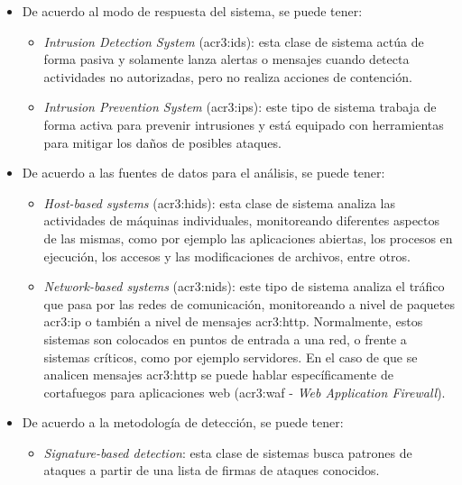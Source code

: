 \begin{itemize}
    \item
    De acuerdo al modo de respuesta del sistema, se puede tener:

    \begin{itemize}
        \item
        \textit{Intrusion Detection System} (\gls{acr3:ids}):
        esta clase de sistema actúa de forma pasiva y solamente lanza
        alertas o mensajes cuando detecta actividades no autorizadas,
        pero no realiza acciones de contención.

        \item
        \textit{Intrusion Prevention System} (\gls{acr3:ips}):
        este tipo de sistema trabaja de forma activa para prevenir
        intrusiones y está equipado con herramientas para mitigar los
        daños de posibles ataques.
    \end{itemize}

    \item
    De acuerdo a las fuentes de datos para el análisis, se puede tener:

    \begin{itemize}
        \item
        \textit{Host-based systems} (\gls{acr3:hids}):
        esta clase de sistema analiza las actividades de máquinas
        individuales, monitoreando diferentes aspectos de las mismas,
        como por ejemplo las aplicaciones abiertas, los procesos en
        ejecución, los accesos y las modificaciones de archivos, entre
        otros.

        \item
        \textit{Network-based systems} (\gls{acr3:nids}):
        este tipo de sistema analiza el tráfico que pasa por las redes
        de comunicación, monitoreando a nivel de paquetes \gls{acr3:ip}
        o también a nivel de mensajes \gls{acr3:http}.
        Normalmente, estos sistemas son colocados en puntos de entrada a
        una red, o frente a sistemas críticos, como por ejemplo servidores.
        En el caso de que se analicen mensajes \gls{acr3:http} se puede
        hablar específicamente de cortafuegos para aplicaciones web
        (\gls{acr3:waf} - \textit{Web Application Firewall}).
    \end{itemize}

    \item
    De acuerdo a la metodología de detección, se puede tener:

    \begin{itemize}
        \item
        \textit{Signature-based detection}:
        esta clase de sistemas busca patrones de ataques a partir de
        una lista de firmas de ataques conocidos.


\end{itemize}
\end{itemize}
